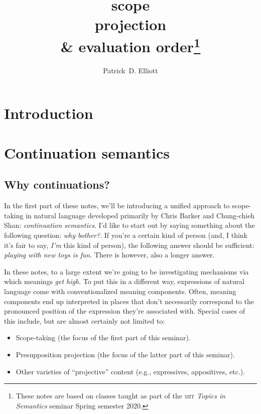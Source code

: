 \documentclass[nols,nofonts,nobib,nohyper]{tufte-book}
\title{scope\\projection\\\& evaluation order\thanks{These notes are based on
    classes taught as part of the \textsc{mit} \textit{Topics in Semantics}
    seminar Spring semester 2020.}}
\author[Patrick D. Elliott]{Patrick~D. Elliott}
\begin{document}
\frontmatter

\maketitle%

\tableofcontents

\chapter{Introduction}

\chapter{Continuation semantics}

\section{Why continuations?}

In the first part of these notes, we'll be introducing a unified approach to
scope-taking in natural language developed primarily by Chris Barker and Chung-chieh Shan:
\textit{continuation semantics}. I'd like to start out by saying
something about the following question: \textit{why bother?}. If you're a
certain kind of person (and, I think it's fair to say, \textit{I'm} this kind of
person), the following answer should be sufficient: \textit{playing with new
  toys is fun}. There is however, also a longer answer.

In these notes, to a large extent we're going to be investigating mechanisms via which
    meanings \textit{get high}. To put this in a different way, expressions of natural language come
    with conventionalized meaning components. Often, meaning components end up
    interpreted in places that don't necessarily correspond to the pronounced
    position of the expression they're associated with. Special cases of this include, but are almost certainly not limited to:

    \begin{itemize}

        \item Scope-taking (the focus of the first part of this seminar).

        \item Presupposition projection (the focus of the latter part of this seminar).

        \item Other varieties of \enquote{projective} content (e.g.,
        expressives, appositives, etc.).

     \end{itemize}
\end{document}

